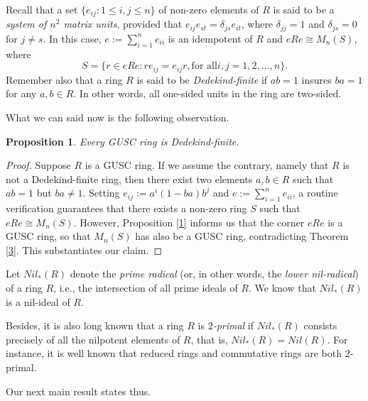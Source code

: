 \documentclass[12pt]{amsart}
\newtheorem{proposition}[theorem]{Proposition}
\theoremstyle{definition}
\newtheorem{remark}[theorem]{Remark}
\begin{document}
Recall that a set $\{e_{ij} : 1 \le i, j \le n\}$ of non-zero elements of $R$ is said to be a {\it system of $n^2$ matrix units}, provided that $e_{ij}e_{st} = \delta_{js}e_{it}$, where $\delta_{jj} = 1$ and $\delta_{js} = 0$ for $j \neq s$. In this case, $e := \sum_{i=1}^{n} e_{ii}$ is an idempotent of $R$ and $eRe \cong M_n(S)$, where $$S = \{r \in eRe : re_{ij} = e_{ij}r, \text{for all} i, j = 1, 2, . . . , n\}.$$
Remember also that a ring $R$ is said to be {\it Dedekind-finite} if $ab=1$ insures $ba=1$ for any $a,b\in R$. In other words, all one-sided units in the ring are two-sided.

\medskip

What we can said now is the following observation.

\begin{proposition}\label{pro3.32}
Every GUSC ring is Dedekind-finite.
\end{proposition}

\begin{proof}
Suppose $R$ is a GUSC ring. If we assume the contrary, namely that $R$ is not a Dedekind-finite ring, then there exist two elements $a, b \in R$ such that $ab = 1$ but $ba \neq 1$. Setting $e_{ij} := a^i(1-ba)b^j$ and
$e :=\sum_{i=1}^{n}e_{ii}$, a routine verification guarantees that there exists a non-zero ring $S$ such that $eRe \cong M_n(S)$. However, Proposition \ref{1} informs us that the corner $eRe$ is a GUSC ring, so that $M_n(S)$ has also be a GUSC ring, contradicting Theorem \ref{3}. This substantiates our claim.
\end{proof}	


Let $Nil_{*}(R)$ denote the {\it prime radical} (or, in other words, the {\it lower nil-radical}) of a ring $R$, i.e., the intersection of all prime ideals of $R$. We know that $Nil_{*}(R)$ is a nil-ideal of $R$.

Besides, it is also long known that a ring $R$ is {\it $2$-primal} if $Nil_{*}(R)$ consists precisely of all the nilpotent elements of $R$, that is, $Nil_{*}(R)=Nil(R)$. For instance, it is well known that reduced rings and commutative rings are both $2$-primal.

\medskip

Our next main result states thus.
\end{document}
